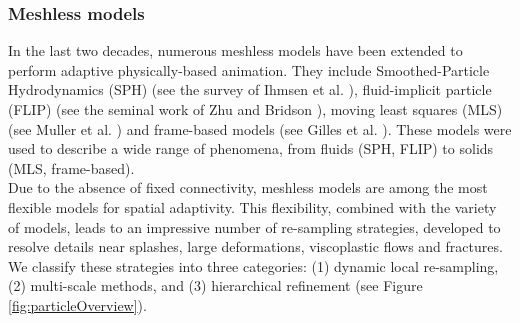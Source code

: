 \subsubsection{Meshless models}
\label{sec:meshless}
In the last two decades, numerous meshless models have been extended to perform adaptive physically-based animation. They include Smoothed-Particle Hydrodynamics (SPH) (see the survey of Ihmsen et al. \cite{Ihmsen2014:STAR}), fluid-implicit particle (FLIP) (see the seminal work of Zhu and Bridson \cite{Zhu2005}), moving least squares (MLS) (see Muller et al. \cite{Muller2004:melting}) and frame-based models (see Gilles et al. \cite{Gilles2011}). These models were used to describe a wide range of phenomena, from fluids (SPH, FLIP) to solids (MLS, frame-based).
\\
Due to the absence of fixed connectivity, meshless models are among the most flexible models for spatial adaptivity. This flexibility, combined with the variety of models, leads to an impressive number of re-sampling strategies, developed to resolve details near splashes, large deformations, viscoplastic flows and fractures. We classify these strategies into three categories: (1) dynamic local re-sampling, (2) multi-scale methods, and (3) hierarchical refinement (see Figure \ref{fig:particleOverview}).
